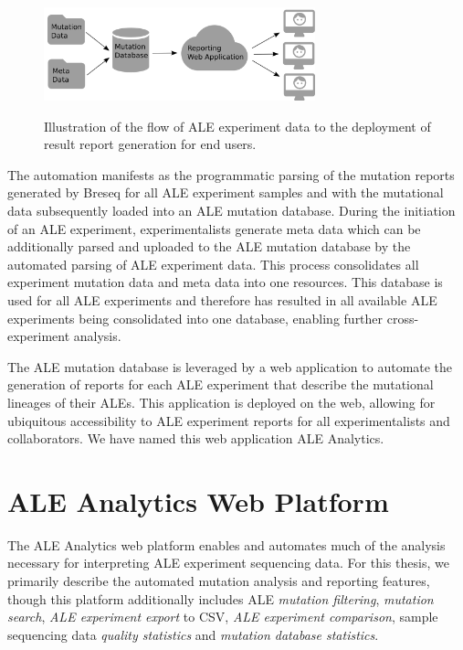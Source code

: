 \documentclass[12pt,final,masters,chapterheads]{ucsd}  %
\begin{document}
\begin{figure}[H]
  \caption{Illustration of the flow of ALE experiment data to the deployment of result report generation for end users.}
  \centering
  \includegraphics[width=0.7\textwidth]{deployment_diagram.png}
  \label{fig:deployment}
\end{figure}

The automation manifests as the programmatic parsing of the mutation reports generated by Breseq for all ALE experiment samples and with the mutational data subsequently loaded into an ALE mutation database. During the initiation of an ALE experiment, experimentalists generate meta data which can be additionally parsed and uploaded to the ALE mutation database by the automated parsing of ALE experiment data. This process consolidates all experiment mutation data and meta data into one resources. This database is used for all ALE experiments and therefore has resulted in all available ALE experiments being consolidated into one database, enabling further cross-experiment analysis.

The ALE mutation database is leveraged by a web application to automate the generation of reports for each ALE experiment that describe the mutational lineages of their ALEs. This application is deployed on the web, allowing for ubiquitous accessibility to ALE experiment reports for all experimentalists and collaborators. We have named this web application ALE Analytics.

\section{ALE Analytics Web Platform}

%
%

The ALE Analytics web platform enables and automates much of the analysis necessary for interpreting ALE experiment sequencing data. For this thesis, we primarily describe the automated mutation analysis and reporting features, though this platform additionally includes ALE \textit{mutation filtering},  \textit{mutation search}, \textit{ALE experiment export} to CSV, \textit{ALE experiment comparison}, sample sequencing data \textit{quality statistics} and \textit{mutation database statistics}.%
\end{document}
